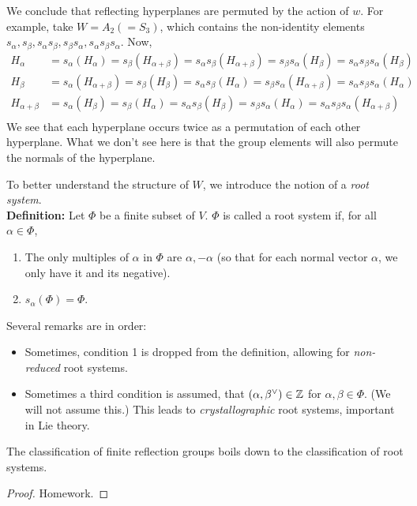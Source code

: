 We conclude that reflecting hyperplanes are permuted by the action of $w$. For
example, take $W = A_2 (= S_3)$,
%
%
which contains the non-identity elements $s_\alpha, s_\beta, s_\alpha s_\beta,
s_\beta s_\alpha, s_\alpha s_\beta s_\alpha$. Now,
\begin{align*}
    H_\alpha
    &= s_\alpha(H_\alpha)
    = s_\beta (H_{\alpha+\beta})
    = s_\alpha s_\beta(H_{\alpha+\beta})
    = s_\beta s_\alpha (H_\beta)
    = s_\alpha s_\beta s_\alpha (H_\beta) \\
    H_\beta
    &= s_\alpha(H_{\alpha+\beta})
    = s_\beta (H_{\beta})
    = s_\alpha s_\beta(H_\alpha)
    = s_\beta s_\alpha (H_{\alpha+\beta})
    = s_\alpha s_\beta s_\alpha (H_{\alpha}) \\
    H_{\alpha+\beta}
    &= s_\alpha(H_{\beta})
    = s_\beta (H_{\alpha})
    = s_\alpha s_\beta(H_\beta)
    = s_\beta s_\alpha (H_{\alpha})
    = s_\alpha s_\beta s_\alpha (H_{\alpha+\beta}) \\
\end{align*}
We see that each hyperplane occurs twice as a permutation of each other
hyperplane. What we don't see here is that the group elements will also permute
the normals of the hyperplane.

To better understand the structure of $W$, we introduce the notion of a
{\em root system}.
\\

{\bf Definition:} Let $\Phi$ be a finite subset of $V$. $\Phi$ is called a root
system if, for all $\alpha \in \Phi$,
\begin{enumerate}
\item The only multiples of $\alpha$ in $\Phi$ are
$\alpha, -\alpha$ (so that for each normal vector $\alpha$, we only have it
and its negative).
\item $s_\alpha(\Phi) = \Phi$.
\end{enumerate}
Several remarks are in order:
\begin{itemize}
\item Sometimes, condition 1 is dropped from the definition, allowing for
{\em non-reduced} root systems.
\item Sometimes a third condition is assumed, that $(\alpha, \beta^\vee) \in \mathbb{Z}$
for $\alpha, \beta \in \Phi$. (We will not assume this.)
This leads to {\em crystallographic} root systems, important in Lie theory.
\end{itemize}

\begin{lemma}
The classification of finite reflection groups boils down to the classification
of root systems.
\end{lemma}

\begin{proof}
Homework.
\end{proof}
